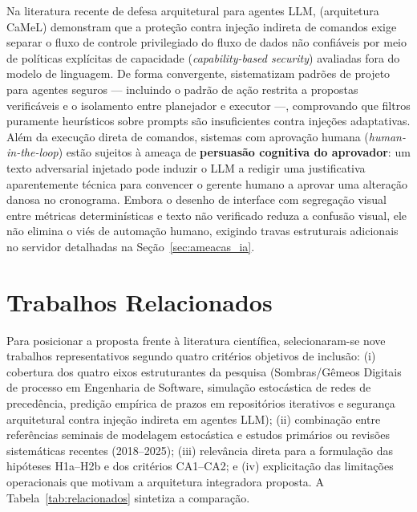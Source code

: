 \documentclass[12pt,openany,oneside,a4paper,english,brazilian,sumario=tradicional]{abntex2}
\begin{document}
Na literatura recente de defesa arquitetural para agentes LLM,  (arquitetura CaMeL) demonstram que a proteção contra injeção indireta de comandos exige separar o fluxo de controle privilegiado do fluxo de dados não confiáveis por meio de políticas explícitas de capacidade (\textit{capability-based security}) avaliadas fora do modelo de linguagem. De forma convergente,  sistematizam padrões de projeto para agentes seguros — incluindo o padrão de ação restrita a propostas verificáveis e o isolamento entre planejador e executor —, comprovando que filtros puramente heurísticos sobre prompts são insuficientes contra injeções adaptativas. Além da execução direta de comandos, sistemas com aprovação humana (\textit{human-in-the-loop}) estão sujeitos à ameaça de \textbf{persuasão cognitiva do aprovador}: um texto adversarial injetado pode induzir o LLM a redigir uma justificativa aparentemente técnica para convencer o gerente humano a aprovar uma alteração danosa no cronograma. Embora o desenho de interface com segregação visual entre métricas determinísticas e texto não verificado reduza a confusão visual, ele não elimina o viés de automação humano, exigindo travas estruturais adicionais no servidor detalhadas na Seção~\ref{sec:ameacas_ia}.

\section{Trabalhos Relacionados}

Para posicionar a proposta frente à literatura científica, selecionaram-se nove trabalhos representativos segundo quatro critérios objetivos de inclusão: (i) cobertura dos quatro eixos estruturantes da pesquisa (Sombras/Gêmeos Digitais de processo em Engenharia de Software, simulação estocástica de redes de precedência, predição empírica de prazos em repositórios iterativos e segurança arquitetural contra injeção indireta em agentes LLM); (ii) combinação entre referências seminais de modelagem estocástica \cite{vanslyke1963,hulett2000,jorgensen2004,vacanti2015} e estudos primários ou revisões sistemáticas recentes (2018--2025); (iii) relevância direta para a formulação das hipóteses H1a--H2b e dos critérios CA1--CA2; e (iv) explicitação das limitações operacionais que motivam a arquitetura integradora proposta. A Tabela~\ref{tab:relacionados} sintetiza a comparação.
\end{document}
